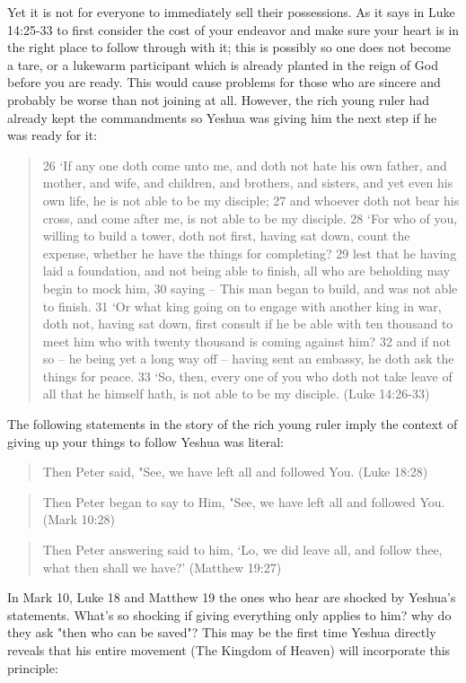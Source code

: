 \documentclass[11pt]{article}
\begin{document}
Yet it is not for everyone to immediately sell their possessions. As it says in Luke 14:25-33 to first consider the cost of your endeavor and make sure your heart is in the right place to follow through with it; this is possibly so one does not become a tare, or a lukewarm participant which is already planted in the reign of God before you are ready. This would cause problems for those who are sincere and probably be worse than not joining at all. However, the rich young ruler had already kept the commandments so Yeshua was giving him the next step if he was ready for it:
\begin{quote}
26 `If any one doth come unto me, and doth not hate his own father, and mother, and wife, and children, and brothers, and sisters, and yet even his own life, he is not able to be my disciple;
27 and whoever doth not bear his cross, and come after me, is not able to be my disciple.
28 `For who of you, willing to build a tower, doth not first, having sat down, count the expense, whether he have the things for completing?
29 lest that he having laid a foundation, and not being able to finish, all who are beholding may begin to mock him,
30 saying -- This man began to build, and was not able to finish.
31 `Or what king going on to engage with another king in war, doth not, having sat down, first consult if he be able with ten thousand to meet him who with twenty thousand is coming against him?
32 and if not so -- he being yet a long way off -- having sent an embassy, he doth ask the things for peace.
33 `So, then, every one of you who doth not take leave of all that he himself hath, is not able to be my disciple. (Luke 14:26-33)
\end{quote}
The following statements in the story of the rich young ruler imply the context of giving up your things to follow Yeshua was literal:
\begin{quote}
Then Peter said, "See, we have left all and followed You. (Luke 18:28)
\end{quote}
\begin{quote}
Then Peter began to say to Him, "See, we have left all and followed You. (Mark 10:28)
\end{quote}
\begin{quote}
Then Peter answering said to him, `Lo, we did leave all, and follow thee, what then shall we have?' (Matthew 19:27)
\end{quote}
In Mark 10, Luke 18 and Matthew 19 the ones who hear are shocked by Yeshua's statements. What's so shocking if giving everything only applies to him? why do they ask "then who can be saved"? This may be the first time Yeshua directly reveals that his entire movement (The Kingdom of Heaven) will incorporate this principle:
\end{document}
